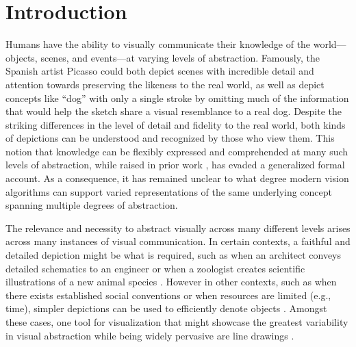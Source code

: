 \documentclass[10pt,letterpaper]{article}
\begin{document}
\section{Introduction}
Humans have the ability to visually communicate their knowledge of the world—objects, scenes, and events—at varying levels of abstraction. 
Famously, the Spanish artist Picasso could both depict scenes with incredible detail and attention towards preserving the likeness to the real world, as well as depict concepts like ``dog'' with only a single stroke by omitting much of the information that would help the sketch share a visual resemblance to a real dog. 
Despite the striking differences in the level of detail and fidelity to the real world, both kinds of depictions can be understood and recognized by those who view them. 
This notion that knowledge can be flexibly expressed and comprehended at many such levels of abstraction, while raised in prior work  \cite{viola2017pondering, chen2020foundations,mccloud1998understanding}, has evaded a generalized formal account. 
As a consequence, it has remained unclear to what degree modern vision algorithms can support varied representations of the same underlying concept spanning multiple degrees of abstraction.




The relevance and necessity to abstract visually across many different levels arises across many instances of visual communication.
In certain contexts, a faithful and detailed depiction might be what is required, such as when an architect conveys detailed schematics to an engineer \cite{suwa1997architects} or when a zoologist creates scientific illustrations of a new animal species \cite{baigrie1996picturing}. 
However in other contexts, such as when there exists established social conventions or when resources are limited (e.g., time), simpler depictions can be used to efficiently denote objects \cite{fan2020pragmatic, garrod2007foundations, hawkins2021visual}. 
Amongst these cases, one tool for visualization that might showcase the greatest variability in visual abstraction while being widely pervasive are line drawings \cite{sayim2011line}.
\end{document}
